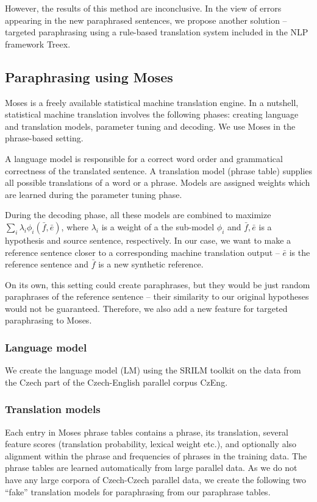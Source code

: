 \documentclass[11pt]{article}
\begin{document}
However, the results of this method are inconclusive. In the view of errors 
appearing in the new paraphrased sentences, we propose another solution -- 
targeted paraphrasing using a rule-based translation system included in the NLP 
framework Treex. \cite{treex}

\subsection{Paraphrasing using Moses}
Moses is a freely available statistical machine translation engine. In a 
nutshell, statistical machine translation involves the following phases: 
creating language and translation models, parameter tuning and decoding. We use 
Moses in the phrase-based setting.

A language model is responsible for a correct word order and grammatical 
correctness of the translated sentence. A translation model (phrase table) 
supplies all possible translations of a word or a phrase. Models are assigned 
weights which are learned during the parameter tuning phase.

During the decoding phase, all these models are combined to maximize 
$ \sum_i \lambda_i \phi_i (\bar{f},\bar{e}) $, where  $ \lambda_i $ is a weight 
of a the sub-model $ \phi_i $ and $ \bar{f},\bar{e} $ is a hypothesis and 
source sentence, respectively. In our case, we want to make a reference 
sentence closer to a corresponding machine translation output -- $ \bar{e} $ is 
the reference sentence and $ \bar{f} $ is a new synthetic reference.

On its own, this setting could create paraphrases, but they would be just 
random paraphrases of the reference sentence -- their similarity to our 
original hypotheses would not be guaranteed. Therefore, we also add a new 
feature for targeted paraphrasing to Moses.

\subsubsection{Language model}
We create the language model (LM) using the SRILM toolkit \cite{srilm} on the 
data from the Czech part of the Czech-English parallel corpus CzEng. 

\subsubsection{Translation models}
Each entry in Moses phrase tables contains a phrase, its translation, several
feature scores (translation probability, lexical weight etc.), and optionally
also alignment within the phrase and frequencies of phrases in the training 
data. The phrase tables are learned automatically from large parallel data.
As we do not have any large corpora of Czech-Czech parallel data, we create the 
following two ``fake'' translation models for paraphrasing from our paraphrase 
tables. 
\end{document}
